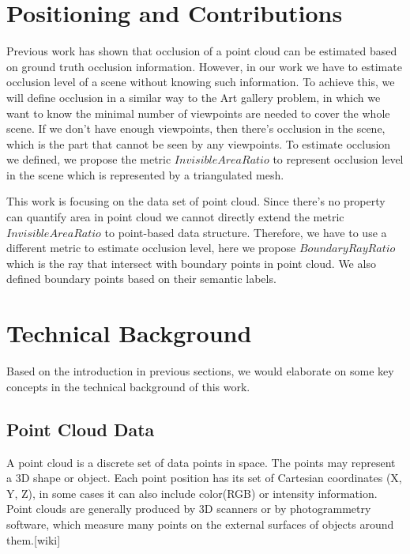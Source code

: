 \documentclass[11pt, a4paper,oneside,chapterprefix=false]{scrbook}
\begin{document}
\section{Positioning and Contributions}

Previous work has shown that occlusion of a point cloud can be estimated based on ground truth occlusion information. However, in our work we have to estimate occlusion level of a scene without knowing such information. To achieve this, we will define 
occlusion in a similar way to the Art gallery problem, in which we want to know the minimal number of viewpoints are needed to cover the whole scene. If we don't have enough viewpoints, then there's occlusion in the scene, which is the part that cannot be seen by any viewpoints. To estimate occlusion we defined, we propose the metric ${InvisibleAreaRatio}$ to represent occlusion level in the scene which is represented by a triangulated mesh. 

\vspace{10pt}

This work is focusing on the data set of point cloud. Since there's no property can quantify area in point cloud we cannot directly extend the metric ${InvisibleAreaRatio}$ to point-based data structure. Therefore, we have to use a different metric to estimate occlusion level, here we propose ${BoundaryRayRatio}$ which is the ray that intersect with boundary points in point cloud. We also defined boundary points based on their semantic labels.

\section{Technical Background}

Based on the introduction in previous sections, we would elaborate on some key concepts in the technical background of this work.

\subsection{Point Cloud Data}

A point cloud is a discrete set of data points in space. The points may represent a 3D shape or object. Each point position has its set of Cartesian coordinates (X, Y, Z), in some cases it can also include color(RGB) or intensity information. Point clouds are generally produced by 3D scanners or by photogrammetry software, which measure many points on the external surfaces of objects around them.[wiki] 
\end{document}
